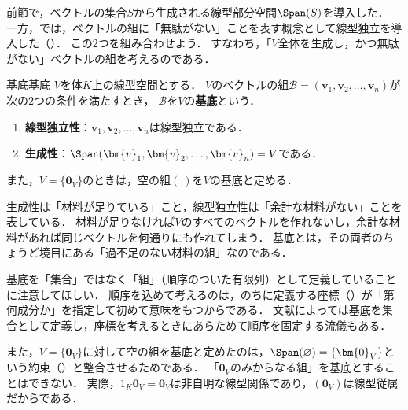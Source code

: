 前節で，ベクトルの集合$S$から生成される線型部分空間$\Span(S)$を導入した．
一方，では，ベクトルの組に「無駄がない」ことを表す概念として線型独立を導入した（）．
この$2$つを組み合わせよう．
すなわち，「$V$全体を生成し，かつ無駄がない」ベクトルの組を考えるのである．

\begin{definition}{基底}{基底}
  $V$を体$K$上の線型空間とする．
  $V$のベクトルの組$\mathcal{B} = (\bm{v}_1, \bm{v}_2, \dots, \bm{v}_n)$が次の$2$つの条件を満たすとき，
  $\mathcal{B}$を$V$の\textbf{基底}という．
  \begin{enumerate}[label=(\roman*),leftmargin=3.2em]
    \item \textbf{線型独立性}：$\bm{v}_1, \bm{v}_2, \dots, \bm{v}_n$は線型独立である．
    \item \textbf{生成性}：$\Span(\bm{v}_1, \bm{v}_2, \dots, \bm{v}_n) = V$である．
  \end{enumerate}
  また，$V = \{\bm{0}_V\}$のときは，空の組$(\ )$を$V$の基底と定める．
\end{definition}

生成性は「材料が足りている」こと，線型独立性は「余計な材料がない」ことを表している．
材料が足りなければ$V$のすべてのベクトルを作れないし，余計な材料があれば同じベクトルを何通りにも作れてしまう．
基底とは，その両者のちょうど境目にある「過不足のない材料の組」なのである．

\begin{remark}
  基底を「集合」ではなく「組」（順序のついた有限列）として定義していることに注意してほしい．
  順序を込めて考えるのは，のちに定義する座標（）が「第何成分か」を指定して初めて意味をもつからである．
  文献によっては基底を集合として定義し，座標を考えるときにあらためて順序を固定する流儀もある．

  また，$V = \{\bm{0}_V\}$に対して空の組を基底と定めたのは，$\Span(\varnothing) = \{\bm{0}_V\}$という約束（）と整合させるためである．
  「$\bm{0}_V$のみからなる組」を基底とすることはできない．
  実際，$1_K \bm{0}_V = \bm{0}_V$は非自明な線型関係であり，$(\bm{0}_V)$は線型従属だからである．
\end{remark}

